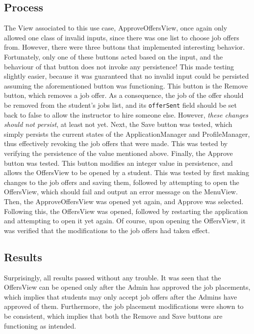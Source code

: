 \documentclass[12pt]{report}
\begin{document}
\subsection*{Process}
The View associated to this use case, ApproveOffersView, once again only allowed one class of
invalid inputs, since there was one list to choose job offers from. However, there were three
buttons that implemented interesting behavior. Fortunately, only one of these buttons acted based on
the input, and the behaviour of that button does not invoke any persistence! This made testing
slightly easier, because it was guaranteed that no invalid input could be persisted assuming the
aforementioned button was functioning. This button is the Remove button, which removes a job offer.
As a consequence, the job of the offer should be removed from the student's jobs list, and its
\texttt{offerSent} field should be set back to false to allow the instructor to hire someone else.
However, \textit{these changes should not persist}, at least not yet. Next, the Save button was
tested, which simply persists the current states of the ApplicationManager and ProfileManager, thus
effectively revoking the job offers that were made. This was tested by verifying the persistence of
the value mentioned above. Finally, the Approve button was tested. This button modifies an integer
value in persistence, and allows the OffersView to be opened by a student. This was tested by first
making changes to the job offers and saving them, followed by attempting to open the OffersView,
which should fail and output an error message on the MenuView. Then, the ApproveOffersView was
opened yet again, and Approve was selected. Following this, the OffersView was opened, followed by
restarting the application and attempting to open it yet again. Of course, upon opening the
OffersView, it was verified that the modifications to the job offers had taken effect.
\subsection*{Results}
Surprisingly, all results passed without any trouble. It was seen that the OffersView can be opened
only after the Admin has approved the job placements, which implies that students may only accept
job offers after the Admins have approved of them. Furthermore, the job placement modifications were
shown to be consistent, which implies that both the Remove and Save buttons are functioning as
intended.
\end{document}
